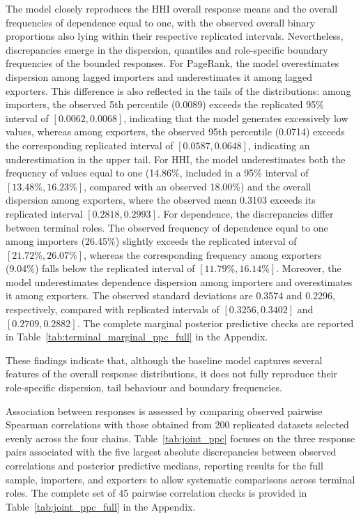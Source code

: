\documentclass[pdftex,12pt,openright,a4paper,oneside]{book}
\begin{document}
The model closely reproduces the HHI overall response means and the overall frequencies of dependence equal to one,
with the observed overall binary proportions also lying within their respective replicated intervals. 
Nevertheless, discrepancies emerge in the dispersion, quantiles and role-specific boundary frequencies of the bounded responses.
For PageRank, the model overestimates dispersion among lagged importers and underestimates it among lagged exporters. 
This difference is also reflected in the tails of the distributions: among importers, the observed 5th percentile (0.0089) exceeds the replicated 95\% 
interval of $[0.0062,0.0068]$, indicating that the model generates excessively low values, whereas among exporters, the observed 95th percentile (0.0714) 
exceeds the corresponding replicated interval of $[0.0587,0.0648]$, indicating an underestimation in the upper tail.
For HHI, the model underestimates both the frequency of values equal to one (14.86\%, included in a 95\% interval of $[13.48\%,16.23\%]$, 
compared with an observed 18.00\%) and the overall dispersion among exporters, where the observed mean 0.3103 exceeds its replicated interval $[0.2818,0.2993]$.
For dependence, the discrepancies differ between terminal roles. The observed frequency of dependence equal to one among importers (26.45\%) 
slightly exceeds the replicated interval of $[21.72\%,26.07\%]$, whereas the corresponding frequency among exporters (9.04\%) 
falls below the replicated interval of $[11.79\%,16.14\%]$. 
Moreover, the model underestimates dependence dispersion among importers and overestimates it among exporters. 
The observed standard deviations are 0.3574 and 0.2296, respectively, compared with replicated intervals of $[0.3256,0.3402]$ and $[0.2709,0.2882]$.
The complete marginal posterior predictive checks are reported in Table~\ref{tab:terminal_marginal_ppc_full} in the Appendix.

These findings indicate that, although the baseline model captures several features of the overall response distributions, 
it does not fully reproduce their role-specific dispersion, tail behaviour and boundary frequencies. 

Association between responses is assessed by comparing observed pairwise 
Spearman correlations with those obtained from 200 replicated datasets 
selected evenly across the four chains. Table~\ref{tab:joint_ppc} focuses 
on the three response pairs associated with the five largest absolute 
discrepancies between observed correlations and posterior predictive 
medians, reporting results for the full sample, importers, and exporters 
to allow systematic comparisons across terminal roles. 
The complete set of 45 pairwise correlation checks is provided in 
Table~\ref{tab:joint_ppc_full} in the Appendix.
\end{document}
